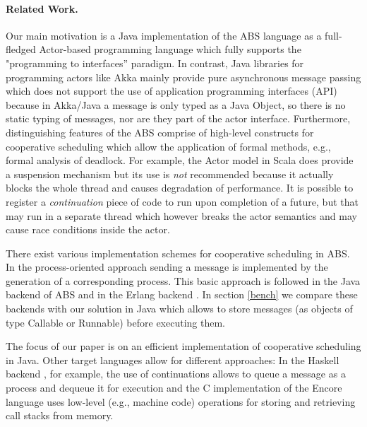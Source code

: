 \paragraph{Related Work.}

Our main motivation is a Java implementation of the ABS language as a full-fledged Actor-based programming language which fully supports the "programming to interfaces'' paradigm.
In contrast, Java libraries for programming actors like Akka \cite{Akka} mainly provide pure asynchronous message passing which does not support the use of application programming interfaces (API) because in Akka/Java a message is only typed as a Java Object, so there is no static typing of messages, nor are they part of the actor interface.
Furthermore, distinguishing features of the ABS comprise of high-level constructs for cooperative scheduling which allow the application of formal methods, e.g.,
formal analysis of deadlock\cite{deadlock}.
For example, the Actor model in Scala \cite{Scala} does provide a suspension mechanism but its use is \emph{not} recommended because it actually blocks the whole thread and causes
degradation of performance.
It is possible to register a {\em continuation} piece of code to run upon completion of a future, but that may run in a separate thread which however breaks the actor semantics and may cause race conditions inside the actor.

There exist various implementation schemes for cooperative scheduling in ABS.
In the process-oriented approach sending a message is implemented by the generation of a corresponding process. This basic approach is followed in the Java backend of ABS \cite{abs,Schafer} and in the Erlang backend \cite{Erlang}.
In section \ref{bench} we compare these backends with our solution in Java which allows to store messages (as objects of type Callable or Runnable) before executing them.

The focus of our paper is on an efficient implementation of cooperative scheduling in Java.
Other target languages allow for different approaches:
In the Haskell backend \cite{Haskell}, for example, the use of continuations allows
to queue a message as a process and dequeue it for execution and the C implementation of the
Encore language \cite{Encore} uses low-level (e.g., machine code) operations for
storing and retrieving call stacks from memory.






